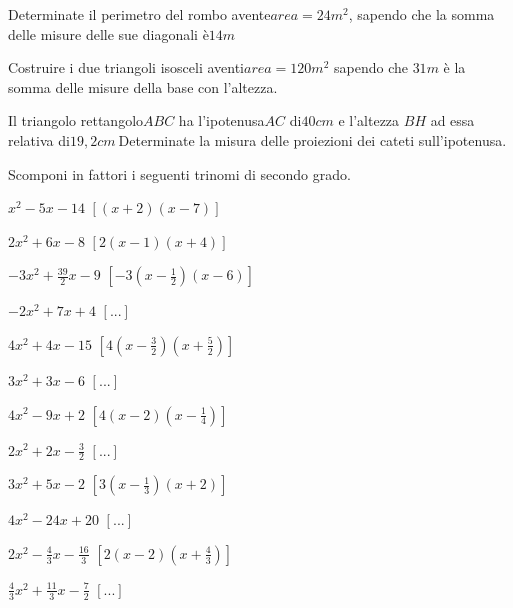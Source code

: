 \begin{esercizio}
 \label{ese:3.81}
Determinate il perimetro del rombo avente$area = 24\unit{m^{2}}$, sapendo che 
la somma delle misure delle sue diagonali è$14\unit{m}$
\end{esercizio}

\begin{esercizio}
\label{ese:3.82}
Costruire i due triangoli isosceli aventi$area = 120\unit{m^{2}}$ sapendo che 
$31\unit{m}$ è la somma delle misure della base con l'altezza.
\end{esercizio}

\begin{esercizio}
 \label{ese:3.83}
Il triangolo rettangolo$ABC$ ha l'ipotenusa$AC$ di$40\unit{cm}$ e l'altezza 
$BH$ ad essa relativa di$19,2\unit{cm}~$Determinate la misura delle proiezioni 
dei cateti sull'ipotenusa.
\end{esercizio}


\begin{esercizio}[\Ast]
 \label{ese:3.84}
Scomponi in fattori i seguenti trinomi di secondo grado.
\begin{multicols}{2}
\begin{enumeratea}
\item$x^{2}-5 x-14$ \hfill$\left[(x + 2) (x-7)\right]$
\item$2 x^{2} + 6 x-8$ \hfill$\left[2 (x-1) (x + 4)\right]$
\item$- 3 x^{2} + \frac{39}{2} x-9$ 
 \hfill$\left[-3 \left(x-\frac{1}{2} \right) (x-6)\right]$
\item$- 2 x^{2} + 7 x + 4$ \hfill$\left[...\right]$
\item$4 x^{2} + 4 x-15$ 
 \hfill$\left[4 \left(x-\frac{3}{2} \right) 
         \left(x + \frac{5}{2} \right)\right]$
\item$3 x^{2} + 3 x-6$ \hfill$\left[...\right]$
\item$4 x^{2}-9 x + 2$ 
 \hfill$\left[4 (x-2) \left(x-\frac{1}{4} \right)\right]$
\item$2 x^{2} + 2 x - \frac{3}{2}$ \hfill$\left[...\right]$
\item$3 x^{2} + 5 x - 2$ 
 \hfill$\left[3 \left(x-\frac{1}{3} \right) (x + 2)\right]$
\item$4 x^{2}-24 x + 20$ 
 \hfill$\left[...\right]$
\item$2 x^{2}-\frac{4}{3} x - \frac{16}{3}$ 
 \hfill$\left[2 (x-2) \left(x + \frac{4}{3} \right)\right]$
\item$\frac{4}{3} x^{2} + \frac{11}{3} x - \frac{7}{2}$ 
 \hfill$\left[...\right]$
\end{enumeratea}
\end{multicols}
\end{esercizio}

